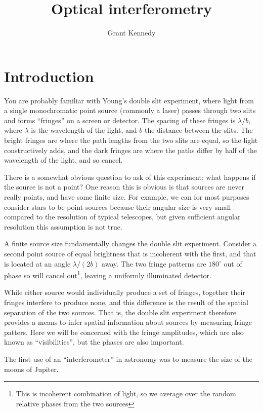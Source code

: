 \documentclass[11pt]{article}
\title{Optical interferometry}
\author{Grant Kennedy}
\begin{document}
\maketitle

\section{Introduction}

You are probably familiar with Young's double slit experiment, where light from a single monochromatic point source (commonly a laser) passes through two slits and forms ``fringes'' on a screen or detector. The spacing of these fringes is $\lambda/b$, where $\lambda$ is the wavelength of the light, and $b$ the distance between the slits. The bright fringes are where the path lengths from the two slits are equal, so the light constructively adds, and the dark fringes are where the paths differ by half of the wavelength of the light, and so cancel.

There is a somewhat obvious question to ask of this experiment; what happens if the source is not a point? One reason this is obvious is that sources are never really points, and have some finite size. For example, we can for most purposes consider stars to be point sources because their angular size is very small compared to the resolution of typical telescopes, but given sufficient angular resolution this assumption is not true.

A finite source size fundamentally changes the double slit experiment. Consider a second point source of equal brightness that is incoherent with the first, and that is located at an angle $\lambda/(2b)$ away. The two fringe patterns are $180^\circ$ out of phase so will cancel out\footnote{This is incoherent combination of light, so we average over the random relative phases from the two sources}, leaving a uniformly illuminated detector.

While either source would individually produce a set of fringes, together their fringes interfere to produce none, and this difference is the result of the spatial separation of the two sources. That is, the double slit experiment therefore provides a means to infer spatial information about sources by measuring fringe patters. Here we will be concerned with the fringe amplitudes, which are also known as ``visibilities'', but the phases are also important.

The first use of an ``interferometer'' in astronomy was to measure the size of the moons of Jupiter.
\end{document}
